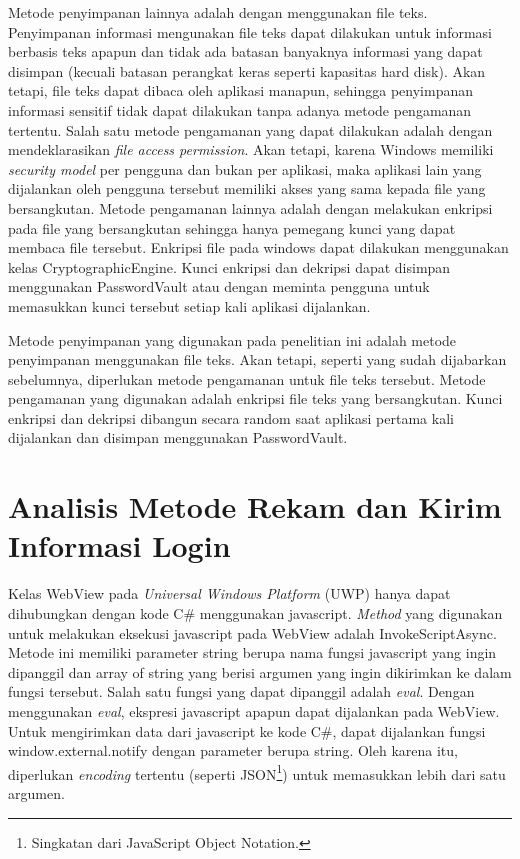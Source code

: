 Metode penyimpanan lainnya adalah dengan menggunakan file teks. Penyimpanan informasi mengunakan file teks dapat dilakukan untuk informasi berbasis teks apapun dan tidak ada batasan banyaknya informasi yang dapat disimpan (kecuali batasan perangkat keras seperti kapasitas hard disk). Akan tetapi, file teks dapat dibaca oleh aplikasi manapun, sehingga penyimpanan informasi sensitif tidak dapat dilakukan tanpa adanya metode pengamanan tertentu. Salah satu metode pengamanan yang dapat dilakukan adalah dengan mendeklarasikan \textit{file access permission}. Akan tetapi, karena Windows memiliki \textit{security model} per pengguna dan bukan per aplikasi, maka aplikasi lain yang dijalankan oleh pengguna tersebut memiliki akses yang sama kepada file yang bersangkutan. Metode pengamanan lainnya adalah dengan melakukan enkripsi pada file yang bersangkutan sehingga hanya pemegang kunci yang dapat membaca file tersebut. Enkripsi file pada windows dapat dilakukan menggunakan kelas CryptographicEngine. Kunci enkripsi dan dekripsi dapat disimpan menggunakan PasswordVault atau dengan meminta pengguna untuk memasukkan kunci tersebut setiap kali aplikasi dijalankan.

Metode penyimpanan yang digunakan pada penelitian ini adalah metode penyimpanan menggunakan file teks. Akan tetapi, seperti yang sudah dijabarkan sebelumnya, diperlukan metode pengamanan untuk file teks tersebut. Metode pengamanan yang digunakan adalah enkripsi file teks yang bersangkutan. Kunci enkripsi dan dekripsi dibangun secara random saat aplikasi pertama kali dijalankan dan disimpan menggunakan PasswordVault.



\section{Analisis Metode Rekam dan Kirim Informasi Login}
\label{sec:metode_rekam}

Kelas WebView pada \textit{Universal Windows Platform} (UWP) hanya dapat dihubungkan dengan kode C\# menggunakan javascript. \textit{Method} yang digunakan untuk melakukan eksekusi javascript pada WebView adalah InvokeScriptAsync. Metode ini memiliki parameter string berupa nama fungsi javascript yang ingin dipanggil dan array of string yang berisi argumen yang ingin dikirimkan ke dalam fungsi tersebut. Salah satu fungsi yang dapat dipanggil adalah \textit{eval}. Dengan menggunakan \textit{eval}, ekspresi javascript apapun dapat dijalankan pada WebView. Untuk mengirimkan data dari javascript ke kode C\#, dapat dijalankan fungsi window.external.notify dengan parameter berupa string. Oleh karena itu, diperlukan \textit{encoding} tertentu (seperti JSON\footnote{Singkatan dari JavaScript Object Notation.}) untuk memasukkan lebih dari satu argumen.

